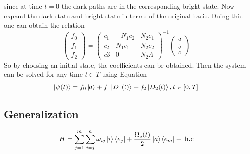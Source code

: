 since at time $t = 0$ the dark paths are in the corresponding bright state.
Now expand the dark state and bright state in terms of the original basis. Doing this one can obtain the relation
\begin{equation}
\begin{pmatrix}
f_0\\
f_1\\
f_2
\end{pmatrix} = \begin{pmatrix}
c_1 & -N_1 c_2 & N_2 c_1
\\
c_2 & N_1 c_1 & N_2 c_2
\\
c3 & 0 & N_2 \Lambda
\end{pmatrix}^{-1}\begin{pmatrix}
a\\
b\\
c
\end{pmatrix}
\end{equation}
So by choosing an initial state, the coefficients can be obtained.
Then the system can be solved for any time $t \in T$ using Equation 
\begin{equation}
\label{eq:expl-time}
\ket{\psi(t)} = f_0\ket{d} + f_1\ket{D_1(t)} + f_2\ket{D_2(t)}, t \in [0,T]
\end{equation}
\newpage
\subsection{Generalization}

\begin{equation}
\label{eq:Gham}
H = \sum_{j = 1}^m \sum_{i = j}^n \omega_{ij} \ket{i}\bra{e_j} + \frac{\Omega_a(t)}{2}\ket{a}\bra{e_m} +\;\text{h.c}
\end{equation}

